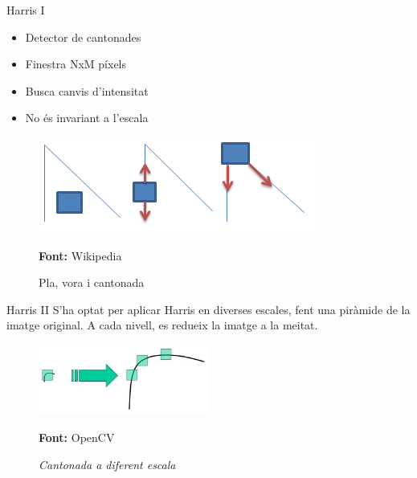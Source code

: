 \documentclass[xcolor=table, 11pt]{beamer}
\newcommand*{\captionsource}[2]{%
  \caption[{#1}]{#1}\par
  \vspace{-0.4cm}
  \tiny{\textbf{Font:} #2\par}}
\newcommand\tz{\fontsize{13}{15.6}\selectfont}
\begin{document}
	\begin{frame}{Harris I}
		\tz
		\begin{minipage}{0.53\textwidth}
			\begin{itemize}
				\item Detector de cantonades
				\item Finestra NxM píxels
				\item Busca canvis d'intensitat
				\item \alert{No és invariant a l'escala}
			\end{itemize}
		\end{minipage}
		\hfill
		\begin{minipage}{0.45\textwidth}
			\begin{figure}[H]
				\includegraphics[width=\textwidth]{images/harris}
				\captionsource{Pla, vora i cantonada\vspace{0.1cm}}{Wikipedia}
			\end{figure}
		\end{minipage}
	\end{frame}

	\begin{frame}{Harris II}
		\tz
		S'ha optat per aplicar Harris en diverses escales, fent una piràmide de la imatge original. A cada nivell, es redueix la imatge a la meitat.
		\begin{figure}[H]
			\centering
			\includegraphics[width=0.5\textwidth]{images/scale_invariant}
			\captionsource{\textit{Cantonada a diferent escala}}{OpenCV}
			\label{fig:vores}
		\end{figure}
	\end{frame}
\end{document}
